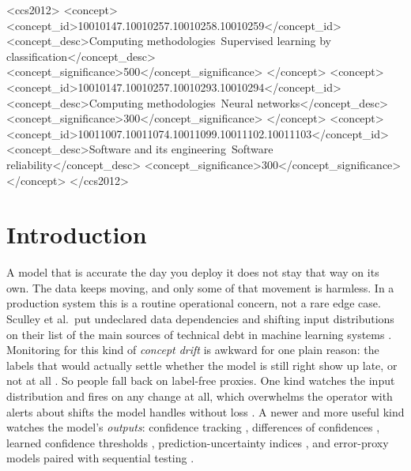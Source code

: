 \documentclass[acmsmall,screen]{acmart}
\theoremstyle{acmdefinition}
\begin{document}
\begin{CCSXML}
<ccs2012>
   <concept>
       <concept_id>10010147.10010257.10010258.10010259</concept_id>
       <concept_desc>Computing methodologies~Supervised learning by classification</concept_desc>
       <concept_significance>500</concept_significance>
       </concept>
   <concept>
       <concept_id>10010147.10010257.10010293.10010294</concept_id>
       <concept_desc>Computing methodologies~Neural networks</concept_desc>
       <concept_significance>300</concept_significance>
       </concept>
   <concept>
       <concept_id>10011007.10011074.10011099.10011102.10011103</concept_id>
       <concept_desc>Software and its engineering~Software reliability</concept_desc>
       <concept_significance>300</concept_significance>
       </concept>
 </ccs2012>
\end{CCSXML}



\maketitle

\section{Introduction}
\label{sec:intro}

A model that is accurate the day you deploy it does not stay that way on its
own. The data keeps moving, and only some of that movement is harmless. In a
production system this is a routine operational concern, not a rare edge
case. Sculley et al.\ put undeclared data dependencies and shifting input
distributions on their list of the main sources of technical debt in machine
learning systems \cite{sculley2015debt}. Monitoring for this kind of
\emph{concept drift} is awkward for one plain reason: the labels that would
actually settle whether the model is still right show up late, or not at all
\cite{gama2014survey, lu2018learning}. So people fall back on label-free
proxies. One kind watches the input distribution and fires on any change at
all, which overwhelms the operator with alerts about shifts the model handles
without loss \cite{rabanser2019failing}. A newer and more useful kind
watches the model's \emph{outputs}: confidence tracking
\cite{hendrycks2017baseline}, differences of confidences
\cite{guillory2021doc}, learned confidence thresholds \cite{garg2022atc},
prediction-uncertainty indices \cite{pudd2025}, and error-proxy models paired
with sequential testing \cite{amoukou2024sequential}.
\end{document}
